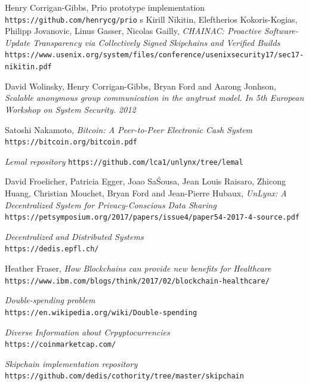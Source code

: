 \documentclass{article}
\begin{document}
\newpage
\begin{thebibliography}{9}
Henry Corrigan-Gibbs, Prio prototype implementation\\
\texttt{https://github.com/henrycg/prio}
s
Kirill Nikitin, Eleftherios Kokoris-Kogias, Philipp Jovanovic, Linus Gasser, Nicolas Gailly, \textit{CHAINAC: Proactive Software-Update Transparency via Collectively Signed Skipchains and Verified Builds}\\
\texttt{https://www.usenix.org/system/files/conference/usenixsecurity17/sec17-nikitin.pdf}

David Wolinsky, Henry Corrigan-Gibbs, Bryan Ford and Aarong Jonhson, \textit{Scalable anonymous group communication in the anytrust model. In 5th European Workshop on System Security. 2012}

Satoshi Nakamoto, \textit{Bitcoin: A Peer-to-Peer Electronic Cash System}\\
\texttt{https://bitcoin.org/bitcoin.pdf}

\textit{Lemal repository}
\texttt{https://github.com/lca1/unlynx/tree/lemal}

David Froelicher, Patricia Egger, Joao Sa\' Sousa, Jean Louis Raisaro, Zhicong Huang, Christian Mouchet, Bryan Ford and Jean-Pierre Hubaux, \textit{UnLynx: A Decentralized System for Privacy-Conscious Data Sharing}\\
\texttt{https://petsymposium.org/2017/papers/issue4/paper54-2017-4-source.pdf}

\textit{Decentralized and Distributed Systems}\\
\texttt{https://dedis.epfl.ch/}

Heather Fraser, \textit{How Blockchains can provide new benefits for Healthcare}\\
\texttt{https://www.ibm.com/blogs/think/2017/02/blockchain-healthcare/}

\textit{Double-spending problem}\\
\texttt{https://en.wikipedia.org/wiki/Double-spending}

\textit{Diverse Information about Crpyptocurrencies}\\
\texttt{https://coinmarketcap.com/}

\textit{Skipchain implementation repository}\\
\texttt{https://github.com/dedis/cothority/tree/master/skipchain}


\end{thebibliography}
\end{document}
